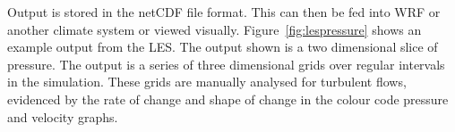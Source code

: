 Output is stored in the netCDF file format. This can then be fed into WRF or
another climate system or viewed visually. Figure~\ref{fig:lespressure} shows an
example output from the LES. The output shown is a two dimensional slice of
pressure. The output is a series of three dimensional grids over regular
intervals in the simulation. These grids are manually analysed for turbulent
flows, evidenced by the rate of change and shape of change in the colour code
pressure and velocity graphs.
